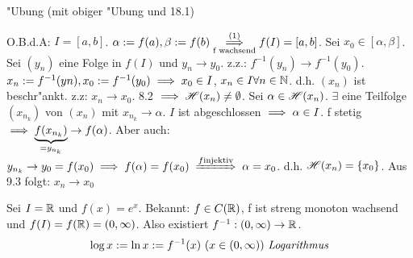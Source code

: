 \documentclass[a4paper,twoside,DIV15,BCOR12mm]{scrbook}
\begin{document}
\begin{beweis}
\begin{liste}
\item "Ubung (mit obiger "Ubung und 18.1)
\item O.B.d.A: $I=[a, b]$. $\alpha:=f(a), \beta:=f(b) \overset{(1)}{\underset{\text{f wachsend}}{\implies}} f(I)=[a,b]$. Sei $x_0 \in [\alpha, \beta]$. Sei $(y_n)$ eine Folge in $f(I)$ und $y_n \to y_0$. z.z.: $f^{-1}(y_n) \to f^{-1}(y_0)$. $x_n:=f^{-1}(yn), x_0:=f^{-1}(y_0) \implies x_0 \in I$, $x_n \in I \forall n \in \mathbb{N}$. d.h. $(x_n)$ ist beschr"ankt. z.z: $x_n \to x_0$. 8.2 $\implies \mathscr{H}(x_n) \ne \emptyset$. Sei $\alpha \in \mathscr{H}(x_n)$. $\exists$ eine Teilfolge $(x_{n_k})$ von $(x_n)$ mit $x_{n_k} \to \alpha$. $I$ ist abgeschlossen $\implies \alpha \in I$. f stetig $\implies \underbrace{f(x_{n_k})}_{=y_{n_k}} \to f(\alpha)$. Aber auch: $y_{n_k} \to y_0 = f(x_0) \folgt f(\alpha) = f(x_0) \folgtwegen{f \text{injektiv}} \alpha=x_0$. d.h. $\mathscr{H}(x_n)=\{x_0\}$. Aus 9.3 folgt: $x_n \to x_0$
\end{liste}
\end{beweis}

\begin{satz}
Sei $I=\mathbb{R}$ und $f(x)=e^x$. Bekannt: $f \in C(\mathbb{R})$, f ist streng monoton wachsend und $f(I) = f(\mathbb{R}) = (0, \infty)$. Also existiert $f^{-1}: (0, \infty) \to \mathbb{R}$. 
\[ \log x := \ln x := f^{-1}(x)\ (x \in (0, \infty))\ \text{\emph{Logarithmus}} \]
\end{satz}

\theoremstyle{nonumberbreak}
\newtheorem{eigenschaften}[satz]{Eigenschaften}
\end{document}
